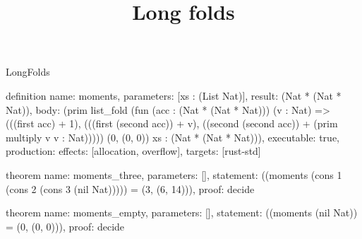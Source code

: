 \begin{lexlean}{LongFolds}
\title{Long folds}
\begin{semanticmodule}
definition{
  name: moments,
  parameters: [xs : (List Nat)],
  result: (Nat * (Nat * Nat)),
  body: (prim list_fold (fun (acc : (Nat * (Nat * Nat))) (v : Nat) => (((first acc) + 1), (((first (second acc)) + v), ((second (second acc)) + (prim multiply v v : Nat))))) (0, (0, 0)) xs : (Nat * (Nat * Nat))),
  executable: true,
  production: {effects: [allocation, overflow], targets: [rust-std]}
}

theorem{
  name: moments_three,
  parameters: [],
  statement: ((moments (cons 1 (cons 2 (cons 3 (nil Nat))))) = (3, (6, 14))),
  proof: decide{}
}

theorem{
  name: moments_empty,
  parameters: [],
  statement: ((moments (nil Nat)) = (0, (0, 0))),
  proof: decide{}
}
\end{semanticmodule}
\end{lexlean}
